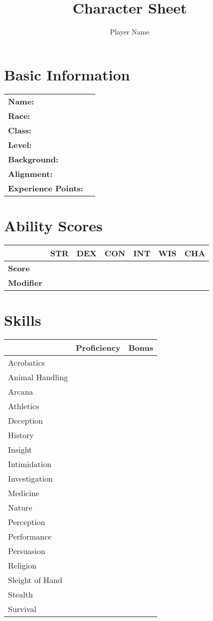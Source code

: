 \documentclass[12pt]{article}
\title{Character Sheet}
\author{Player Name}
\begin{document}
\maketitle

\section{Basic Information}
\begin{tabularx}{\linewidth}{lX}
\textbf{Name:} & \\
\textbf{Race:} & \\
\textbf{Class:} & \\
\textbf{Level:} & \\
\textbf{Background:} & \\
\textbf{Alignment:} & \\
\textbf{Experience Points:} & \\
\end{tabularx}

\section{Ability Scores}
\begin{tabularx}{\linewidth}{lcccccc}
\toprule
& \textbf{STR} & \textbf{DEX} & \textbf{CON} & \textbf{INT} & \textbf{WIS} & \textbf{CHA} \\
\midrule
\textbf{Score} &  &  &  &  &  &  \\
\textbf{Modifier} &  &  &  &  &  &  \\
\bottomrule
\end{tabularx}

\section{Skills}
\begin{tabularx}{\linewidth}{lcc}
\toprule
& \textbf{Proficiency} & \textbf{Bonus} \\
\midrule
Acrobatics &  &  \\
Animal Handling &  &  \\
Arcana &  &  \\
Athletics &  &  \\
Deception &  &  \\
History &  &  \\
Insight &  &  \\
Intimidation &  &  \\
Investigation &  &  \\
Medicine &  &  \\
Nature &  &  \\
Perception &  &  \\
Performance &  &  \\
Persuasion &  &  \\
Religion &  &  \\
Sleight of Hand &  &  \\
Stealth &  &  \\
Survival &  &  \\
\bottomrule
\end{tabularx}
\end{document}
